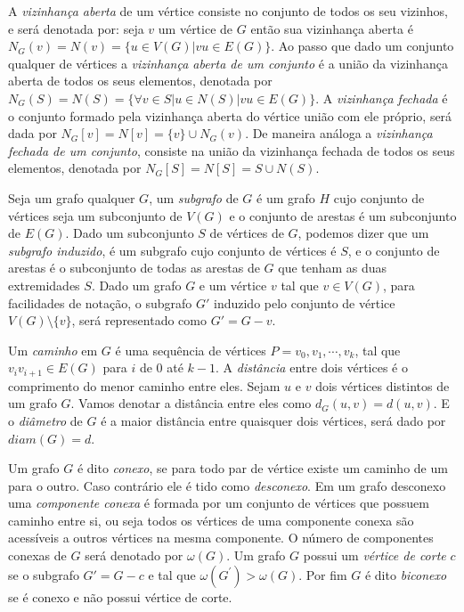 A \textit{vizinhança aberta} de um vértice consiste no conjunto de todos os seu vizinhos, e será denotada por: seja $v$ um vértice de $G$ então sua vizinhança aberta é $N_G(v)=N(v)=\{u \in V(G)|vu \in E(G)\}$. Ao passo que dado um conjunto qualquer de vértices a \textit{vizinhança aberta de um conjunto} é a união da vizinhança aberta de todos os seus elementos, denotada por $N_G(S)=N(S)=\{\forall v \in S| u \in N(S)|vu \in E(G)\}$.  A \textit{vizinhança fechada} é o conjunto formado pela vizinhança aberta do vértice união com ele próprio, será dada por $N_G[v] = N[v]=\{v\} \cup N_G(v)$. De maneira análoga  a \textit{vizinhança fechada de um conjunto}, consiste na união da vizinhança fechada de todos os seus elementos, denotada por $N_G[S]=N[S]=S\cup N(S)$.

Seja um grafo qualquer $G$, um \textit{subgrafo} de $G$ é um grafo $H$ cujo conjunto de vértices seja um subconjunto de $V(G)$ e o conjunto de arestas é um subconjunto de $E(G)$. Dado um subconjunto $S$ de vértices de $G$, podemos dizer que um \textit{subgrafo induzido}, é um subgrafo cujo conjunto de vértices é $S$, e o conjunto de arestas é o subconjunto de todas as arestas de $G$ que tenham as duas extremidades $S$. Dado um grafo $G$ e um vértice $v$ tal que $v \in V(G)$, para facilidades de notação, o subgrafo $G'$ induzido pelo conjunto de vértice $V(G)\setminus\{v\}$, será representado como $G'=G-v$.

Um \textit{caminho} em $G$ é uma sequência de vértices $P=v_0,v_1,\cdots,v_k$, tal que $v_iv_{i+1} \in E(G)$ para $i$ de $0$ até $k-1$. A \textit{distância} entre dois vértices é o comprimento do menor caminho entre eles. Sejam $u$ e $v$ dois vértices distintos de um grafo $G$. Vamos denotar a distância entre eles como $d_G(u,v)=d(u,v)$. E o \textit{diâmetro} de $G$ é a maior distância entre quaisquer dois vértices, será dado por $diam(G)=d$. 

Um grafo $G$ é dito \textit{conexo}, se para todo par de vértice existe um caminho de um para o outro. Caso contrário ele é tido como \textit{desconexo}. Em um grafo desconexo uma \textit{componente conexa} é formada por um conjunto de vértices que possuem caminho entre si, ou seja todos os vértices de uma componente conexa são acessíveis a outros vértices na mesma componente. O número de componentes conexas de $G$ será denotado por $\omega(G)$. Um grafo $G$ possui um \textit{vértice de corte} $c$ se o subgrafo $G'= G-c$ e tal que $\omega(G^\prime)>\omega(G)$. Por fim $G$ é dito \textit{biconexo} se é conexo e não possui vértice de corte. 

